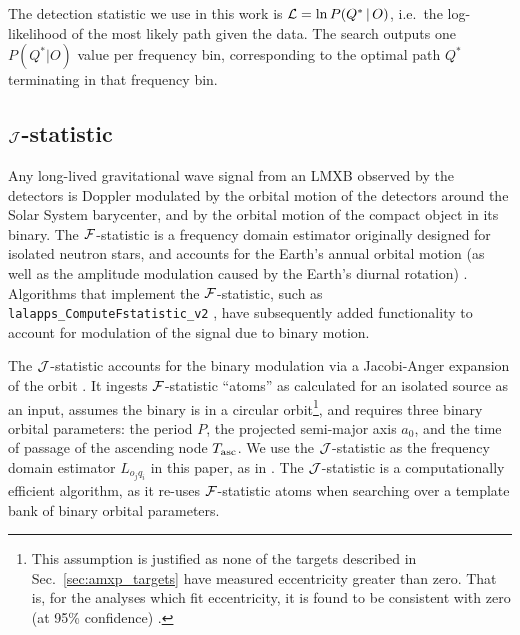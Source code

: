 The detection statistic we use in this work is $\mathcal{L} = \ln P(Q^{*}\,|\,O)$, i.e.~the log-likelihood of the most likely path given the data. The search outputs one $P(Q^{*}|O)$ value per frequency bin, corresponding to the optimal path $Q^{*}$ terminating in that frequency bin.
   
\subsection{\texorpdfstring{$\mathcal{J}$}{J}-statistic\label{sec:amxp_jstat}} 
Any long-lived gravitational wave signal from an LMXB observed by the detectors is Doppler modulated by the orbital motion of the detectors around the Solar System barycenter, and by the orbital motion of the compact object in its binary. The $\mathcal{F}$-statistic is a frequency domain estimator originally designed for isolated neutron stars, and accounts for the Earth's annual orbital motion (as well as the amplitude modulation caused by the Earth's diurnal rotation) \cite{JKS98}. Algorithms that implement the $\mathcal{F}$-statistic, such as \texttt{lalapps\_ComputeFstatistic\_v2} \cite{LAL2018}, have subsequently added functionality to account for modulation of the signal due to binary motion. 

The $\mathcal{J}$-statistic accounts for the binary modulation via a Jacobi-Anger expansion of the orbit \cite{Suvorova2017}. It ingests $\mathcal{F}$-statistic ``atoms'' as calculated for an isolated source as an input, assumes the binary is in a circular orbit\footnote{This assumption is justified as none of the targets described in Sec.~\ref{sec:amxp_targets} have measured eccentricity greater than zero. That is, for the analyses which fit eccentricity, it is found to be consistent with zero (at 95\% confidence) \cite{DiSalvo2022, Patruno2021}.}, and requires three binary orbital parameters: the period $P$, the projected semi-major axis $a_0$, and the time of passage of the ascending node $T_{\textrm{asc}}$. We use the $\mathcal{J}$-statistic as the frequency domain estimator $L_{o_j q_i}$ in this paper, as in \citet{o2vitsco, Middleton2020}. The $\mathcal{J}$-statistic is a computationally efficient algorithm, as it re-uses $\mathcal{F}$-statistic atoms when searching over a template bank of binary orbital parameters. 

